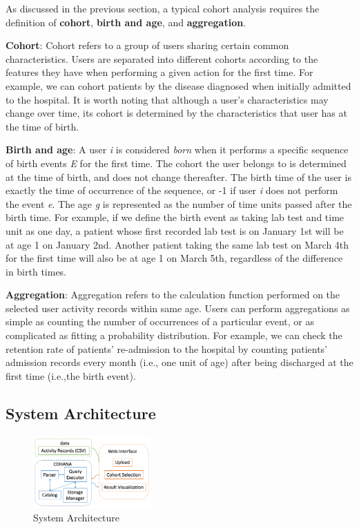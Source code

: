\documentclass[10pt,conference,letterpaper]{IEEEtran}
\begin{document}
As discussed in the previous section, a typical cohort analysis requires the definition of \textbf{cohort}, \textbf{birth and age}, and \textbf{aggregation}. 

\textbf{Cohort}: Cohort refers to a group of users sharing certain common characteristics. Users are separated into different cohorts according to the features they have when performing a given action for the first time. For example, we can cohort patients by the disease diagnosed when initially admitted to the hospital. It is worth noting that although a user's characteristics may change over time, its cohort is determined by the characteristics that user has at the time of birth.

\textbf{Birth and age}: A user \emph{i} is considered \emph{born} when it performs a specific sequence of birth events \emph{E} for the first time.
The cohort the user belongs to is determined at the time of birth, and does not change thereafter.
The birth time of the user is exactly the time of occurrence of the sequence, or -1 if user \emph{i} does not perform the event \emph{e}. 
The age \emph{g} is represented as the number of time units passed after the birth time. For example, if we define the birth event as taking lab test and time unit as one day, a patient whose first recorded lab test is on January 1st will be at age 1 on January 2nd. 
Another patient taking the same lab test on March 4th for the first time will also be at age 1 on March 5th, regardless of the difference in birth times. 

\textbf{Aggregation}: Aggregation refers to the calculation function performed on the selected user activity records within same age. Users can perform aggregations as simple as counting the number of occurrences of a particular event, or as complicated as fitting a probability distribution. For example, we can check the retention rate of patients' re-admission to the hospital by counting patients' admission records every month (i.e., one unit of age) after being discharged at the first time (i.e.,the birth event).

\subsection{System Architecture}

\begin{figure}
    \centering
    \includegraphics[width=0.4\textwidth]{arch.png}
    \caption{System Architecture}
    \label{fig:sys_arch}
\end{figure}
\end{document}
